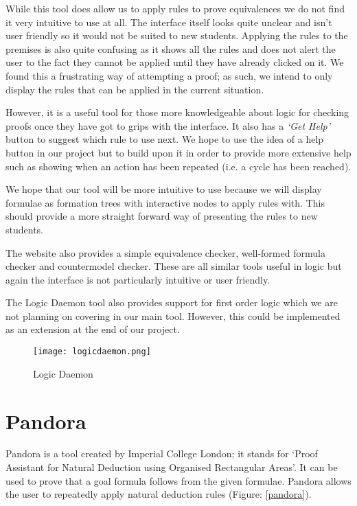\documentclass{report}
\begin{document}
While this tool does allow us to apply rules to prove equivalences we do not find it very intuitive to use at all. The interface itself looks quite unclear and isn't user friendly so it would not be suited to new students. Applying the rules to the premises is also quite confusing as it shows all the rules and does not alert the user to the fact they cannot be applied until they have already clicked on it. We found this a frustrating way of attempting a proof; as such, we intend to only display the rules that can be applied in the current situation.

However, it is a useful tool for those more knowledgeable about logic for checking proofs once they have got to grips with the interface. It also has a \textit{`Get Help'} button to suggest which rule to use next. We hope to use the idea of a help button in our project but to build upon it in order to provide more extensive help such as showing when an action has been repeated (i.e. a cycle has been reached).

We hope that our tool will be more intuitive to use because we will display formulae as formation trees with interactive nodes to apply rules with. This should provide a more straight forward way of presenting the rules to new students.

The website also provides a simple equivalence checker, well-formed formula checker and countermodel checker. These are all similar tools useful in logic but again the interface is not particularly intuitive or user friendly.

The Logic Daemon tool also provides support for first order logic which we are not planning on covering in our main tool. However, this could be implemented as an extension at the end of our project.

\begin{figure}[ht]
    \centering
    \texttt{[image: logicdaemon.png]}
    \caption{Logic Daemon}
    \label{logicdaemon}
\end{figure}

\section{Pandora}
\label{sec:pandora}

Pandora\cite{pandora} is a tool created by Imperial College London; it stands for `Proof Assistant for Natural Deduction using Organised Rectangular Areas'. It can be used to prove that a goal formula follows from the given formulae. Pandora allows the user to repeatedly apply natural deduction rules (Figure: \ref{pandora}).
\end{document}
